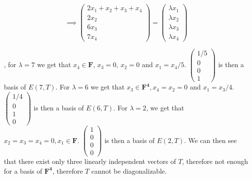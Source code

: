 \begin{solution}
$$\implies \begin{pmatrix} 2x_1 + x_2 + x_3 + x_4 \\ 2x_2 \\ 6x_3 \\ 7x_4 \end{pmatrix} = \begin{pmatrix} \lambda x_1 \\ \lambda x_2 \\ \lambda x_3 \\ \lambda x_4 \end{pmatrix} $$

, for $\lambda = 7$ we get that $x_4 \in \mathbf{F}$, $x_3 = 0$, $x_2 = 0$ and $x_1 = x_4/5$. $\begin{pmatrix} 1/5 \\ 0 \\ 0 \\ 1 \end{pmatrix}$ is then a basis of $E(7, T)$. For $\lambda = 6$ we get that $x_3 \in \mathbf{F^4}, x_4 = x_2 = 0$ and $x_1 = x_3/4$.  $\begin{pmatrix} 1/4 \\ 0 \\ 1 \\ 0 \end{pmatrix}$ is then a basis of $E(6, T)$. For $\lambda = 2$, we get that $x_2 = x_3 = x_4 = 0, x_1 \in \mathbf{F}$. $\begin{pmatrix} 1 \\ 0 \\ 0 \\ 0 \end{pmatrix}$ is then a basis of $E(2, T)$. We can then see that there exist only three linearly independent vectors of $T$, therefore not enough for a basis of $\mathbf{F^4}$, therefore $T$ cannot be diagonalizable.

\end{solution}

